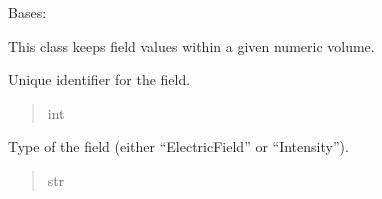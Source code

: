 \documentclass[letterpaper,10pt,english]{sphinxmanual}
\begin{document}
\begin{fulllineitems}
\label{\detokenize{source/Box:Box.Field}}
\pysigstartsignatures
\pysiglinewithargsret
{}
{\sphinxparamcomma {}\sphinxparamcomma {}}
{}
\pysigstopsignatures
\sphinxAtStartPar
Bases: 

\sphinxAtStartPar
This class keeps field values within a given numeric volume.

\begin{fulllineitems}
\label{\detokenize{source/Box:Box.Field.identifier}}
\pysigstartsignatures
\pysigline
{}
\pysigstopsignatures
\sphinxAtStartPar
Unique identifier for the field.
\begin{quote}\begin{description}
\sphinxAtStartPar
int

\end{description}\end{quote}

\end{fulllineitems}


\begin{fulllineitems}
\label{\detokenize{source/Box:Box.Field.field_type}}
\pysigstartsignatures
\pysigline
{}
\pysigstopsignatures
\sphinxAtStartPar
Type of the field (either “ElectricField” or “Intensity”).
\begin{quote}\begin{description}
\sphinxAtStartPar
str

\end{description}\end{quote}


\end{fulllineitems}
\end{fulllineitems}
\end{document}
